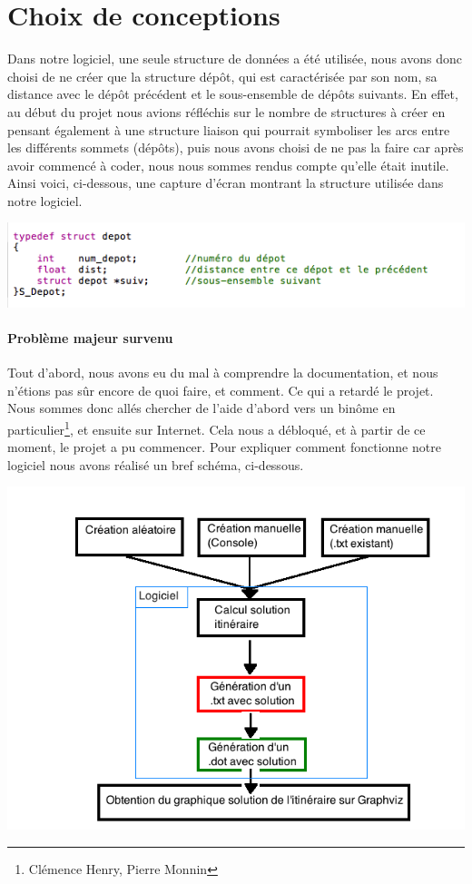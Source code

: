 \documentclass[12pt,a4paper]{report}
\begin{document}
\section{Choix de conceptions}
Dans notre logiciel, une seule structure de données a été utilisée, nous avons donc choisi de ne créer que la structure dépôt, qui est caractérisée par son nom, sa distance avec le dépôt précédent et le sous-ensemble de dépôts suivants. En effet, au début du projet nous avions réfléchis sur le nombre de structures à créer en pensant également à une structure liaison qui pourrait symboliser les arcs entre les différents sommets (dépôts), puis nous avons choisi de ne pas la faire car après avoir commencé à coder, nous nous sommes rendus compte qu'elle était inutile. Ainsi voici, ci-dessous, une capture d'écran montrant la structure utilisée dans notre logiciel.

\begin{center}
\includegraphics[scale=0.7]{capture2.png}
\end{center} 

\paragraph{Problème majeur survenu}
Tout d'abord, nous avons eu du mal \`{a} comprendre la documentation, et nous n'\'{e}tions pas s\^ur encore de quoi faire, et comment. Ce qui a retard\'{e} le projet. Nous sommes donc all\'{e}s chercher de l'aide d'abord vers un binôme en particulier\footnote{Clémence Henry, Pierre Monnin}, et ensuite sur Internet. Cela nous a d\'{e}bloqu\'{e}, et \`{a} partir de ce moment, le projet a pu commencer.
Pour expliquer comment fonctionne notre logiciel nous avons réalisé un bref schéma, ci-dessous.
\begin{center}
\includegraphics[scale=0.6]{conception.png}
\end{center} 
\end{document}
